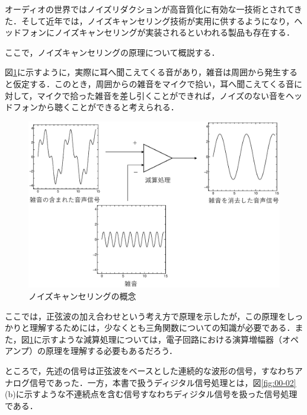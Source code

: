 
オーディオの世界ではノイズリダクションが高音質化に有効な一技術とされてきた．そして近年では，ノイズキャンセリング技術が実用に供するようになり，ヘッドフォンにノイズキャンセリングが実装されるといわれる製品も存在する．

ここで，ノイズキャンセリングの原理について概説する．

図\ref{fig:00-01}に示すように，実際に耳へ聞こえてくる音があり，雑音は周囲から発生すると仮定する．このとき，周囲からの雑音をマイクで拾い，耳へ聞こえてくる音に対して，マイクで拾った雑音を差し引くことができれば，ノイズのない音をヘッドフォンから聴くことができると考えられる\footnotemark ．


\begin{figure}[H]
\begin{center}
\includegraphics[width=.85\textwidth]{fig/zu-01-01.eps}
\end{center}
\caption{ノイズキャンセリングの概念}
\label{fig:00-01}
\end{figure}

ここでは，正弦波の加え合わせという考え方で原理を示したが，この原理をしっかりと理解するためには，少なくとも三角関数についての知識が必要である．また，図\ref{fig:00-01}に示すような減算処理については，電子回路における演算増幅器（オペアンプ）の原理を理解する必要もあるだろう．

ところで，先述の信号は正弦波をベースとした連続的な波形の信号，すなわちアナログ信号であった．一方，本書で扱うディジタル信号処理とは，図\ref{fig:00-02}(b)に示すような不連続点を含む信号すなわちディジタル信号を扱った信号処理である．

